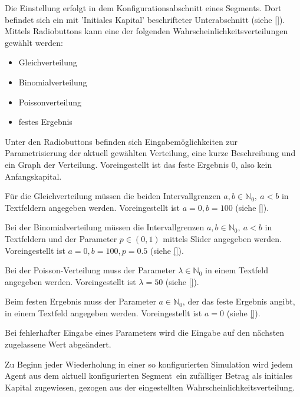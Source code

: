 \documentclass[parskip=full,11pt,twoside]{scrartcl}
\def\segment{Segment}
\begin{document}
Die Einstellung erfolgt in dem Konfigurationsabschnitt eines \segment s. Dort befindet sich ein mit 'Initiales Kapital' beschrifteter Unterabschnitt (siehe \cref{}). Mittels Radiobuttons kann eine der folgenden Wahrscheinlichkeitsverteilungen gewählt werden:
\begin{itemize}
\item Gleichverteilung
\item Binomialverteilung
\item Poissonverteilung
\item festes Ergebnis
\end{itemize}
Unter den Radiobuttons befinden sich Eingabemöglichkeiten zur Parametrisierung der aktuell gewählten Verteilung, eine kurze Beschreibung und ein Graph der Verteilung. Voreingestellt ist das feste Ergebnis \(0\), also kein Anfangskapital.

Für die Gleichverteilung müssen die beiden Intervallgrenzen \(a,b \in \mathbb{N}_0, \ a < b\) in Textfeldern angegeben werden. Voreingestellt ist \(a = 0, b = 100\) (siehe \cref{}).

Bei der Binomialverteilung müssen die Intervallgrenzen \(a,b \in \mathbb{N}_0, \ a < b\) in Textfeldern und der Parameter \(p \in (0,1)\) mittels Slider angegeben werden. Voreingestellt ist \(a = 0, b = 100, p = 0.5\) (siehe \cref{}).

Bei der Poisson-Verteilung muss der Parameter \(\lambda \in \mathbb{N}_0\) in einem Textfeld angegeben werden. Voreingestellt ist \(\lambda = 50\) (siehe \cref{}).

Beim festen Ergebnis muss der Parameter \(a \in \mathbb{N}_0\), der das feste Ergebnis angibt, in einem Textfeld angegeben werden. Voreingestellt ist \(a = 0\) (siehe \cref{}).

Bei fehlerhafter Eingabe eines Parameters wird die Eingabe auf den nächsten zugelassene Wert abgeändert.

Zu Beginn jeder Wiederholung in einer so konfigurierten Simulation wird jedem Agent aus dem aktuell konfigurierten \segment\ ein zufälliger Betrag als initiales Kapital zugewiesen, gezogen aus der eingestellten Wahrscheinlichkeitsverteilung.
\end{document}
